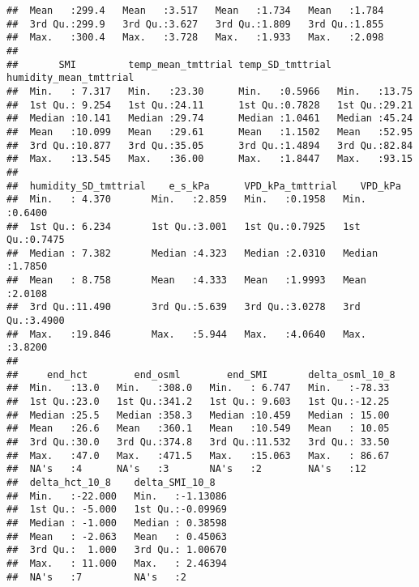 \documentclass[
]{article}
\begin{document}
\begin{verbatim}
##  Mean   :299.4   Mean   :3.517   Mean   :1.734   Mean   :1.784  
##  3rd Qu.:299.9   3rd Qu.:3.627   3rd Qu.:1.809   3rd Qu.:1.855  
##  Max.   :300.4   Max.   :3.728   Max.   :1.933   Max.   :2.098  
##                                                                 
##       SMI         temp_mean_tmttrial temp_SD_tmttrial humidity_mean_tmttrial
##  Min.   : 7.317   Min.   :23.30      Min.   :0.5966   Min.   :13.75         
##  1st Qu.: 9.254   1st Qu.:24.11      1st Qu.:0.7828   1st Qu.:29.21         
##  Median :10.141   Median :29.74      Median :1.0461   Median :45.24         
##  Mean   :10.099   Mean   :29.61      Mean   :1.1502   Mean   :52.95         
##  3rd Qu.:10.877   3rd Qu.:35.05      3rd Qu.:1.4894   3rd Qu.:82.84         
##  Max.   :13.545   Max.   :36.00      Max.   :1.8447   Max.   :93.15         
##                                                                             
##  humidity_SD_tmttrial    e_s_kPa      VPD_kPa_tmttrial    VPD_kPa      
##  Min.   : 4.370       Min.   :2.859   Min.   :0.1958   Min.   :0.6400  
##  1st Qu.: 6.234       1st Qu.:3.001   1st Qu.:0.7925   1st Qu.:0.7475  
##  Median : 7.382       Median :4.323   Median :2.0310   Median :1.7850  
##  Mean   : 8.758       Mean   :4.333   Mean   :1.9993   Mean   :2.0108  
##  3rd Qu.:11.490       3rd Qu.:5.639   3rd Qu.:3.0278   3rd Qu.:3.4900  
##  Max.   :19.846       Max.   :5.944   Max.   :4.0640   Max.   :3.8200  
##                                                                        
##     end_hct        end_osml        end_SMI       delta_osml_10_8 
##  Min.   :13.0   Min.   :308.0   Min.   : 6.747   Min.   :-78.33  
##  1st Qu.:23.0   1st Qu.:341.2   1st Qu.: 9.603   1st Qu.:-12.25  
##  Median :25.5   Median :358.3   Median :10.459   Median : 15.00  
##  Mean   :26.6   Mean   :360.1   Mean   :10.549   Mean   : 10.05  
##  3rd Qu.:30.0   3rd Qu.:374.8   3rd Qu.:11.532   3rd Qu.: 33.50  
##  Max.   :47.0   Max.   :471.5   Max.   :15.063   Max.   : 86.67  
##  NA's   :4      NA's   :3       NA's   :2        NA's   :12      
##  delta_hct_10_8    delta_SMI_10_8    
##  Min.   :-22.000   Min.   :-1.13086  
##  1st Qu.: -5.000   1st Qu.:-0.09969  
##  Median : -1.000   Median : 0.38598  
##  Mean   : -2.063   Mean   : 0.45063  
##  3rd Qu.:  1.000   3rd Qu.: 1.00670  
##  Max.   : 11.000   Max.   : 2.46394  
##  NA's   :7         NA's   :2
\end{verbatim}
\end{document}
